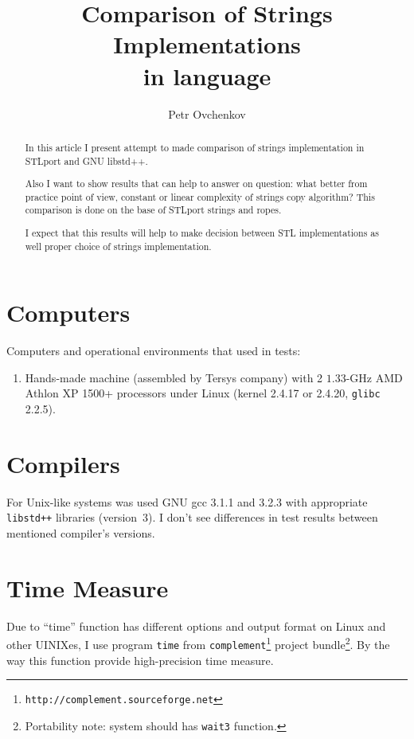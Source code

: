 \documentclass[a4paper]{article}
\title{Comparison of Strings Implementations \\ in \CPP{} language}
\author{Petr Ovchenkov}
\providecommand{\STLport}{{\fontfamily{cmss}\selectfont STLport}}
\providecommand{\libstd}{{\fontfamily{cmtt}\selectfont GNU \mbox{libstd++}}}
\begin{document}
\maketitle

\begin{abstract}
In this article I present attempt to made comparison of
strings implementation in \STLport{} and \libstd.

Also I want to show results that can help
to answer on question: what better from practice point of view,
constant or linear complexity of strings copy algorithm?
This comparison is done on the base of STLport strings and ropes.

I expect that this results will help to make decision between
STL implementations as well proper choice of strings implementation.
\end{abstract}

\section{Computers}

Computers and operational environments that used in tests:
\begin{enumerate}
  \item Hands-made machine (assembled by Tersys company) with 2 $1.33$-GHz
        AMD Athlon XP 1500+ processors under Linux (kernel 2.4.17
        or 2.4.20, \verb|glibc| 2{.}2{.}5).
\end{enumerate}

\section{Compilers}

For Unix-like systems was used GNU gcc 3{.}1{.}1 and 3{.}2{.}3 with appropriate
\verb|libstd++| libraries (version~3). I don't see
differences in test results between mentioned compiler's versions.

\section{Time Measure\label{timemeasure}}

Due to ``time'' function has different options and output format on Linux
and other UINIXes, I use program \texttt{time} from
\texttt{complement}\footnote{\texttt{http://complement.sourceforge.net}}
project bundle\footnote{Portability note: system should has \texttt{wait3} function.}.
By the way this function provide high-precision time measure.
\end{document}
